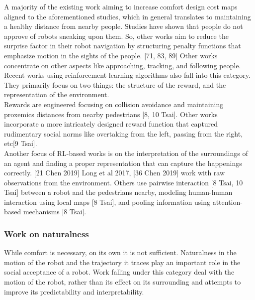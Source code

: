 A majority of the existing work aiming to increase comfort design cost maps aligned to the aforementioned studies, which in general translates to maintaining a healthy distance from nearby people. Studies have shown that people do not approve of robots sneaking upon them. So, other works aim to reduce the surprise factor in their robot navigation by structuring penalty functions that emphasize motion in the sights of the people. [71, 83, 89]
Other works concentrate on other aspects like approaching, tracking, and following people.\\

Recent works using reinforcement learning algorithms also fall into this category. They primarily focus on two things: the structure of the reward, and the representation of the environment. \\

Rewards are engineered focusing on collision avoidance and maintaining proxemics distances from nearby pedestrians [8, 10 Tsai]. Other works incorporate a more intricately designed reward function that captured rudimentary social norms like overtaking from the left, passing from the right, etc[9 Tsai]. \\

Another focus of RL-based works is on the interpretation of the surroundings of an agent and finding a proper representation that can capture the happenings correctly. [21 Chen 2019] Long et al 2017, [36 Chen 2019] work with raw observations from the environment. Others use pairwise interaction [8 Tsai, 10 Tsai] between a robot and the pedestrians nearby, modeling human-human interaction using local maps [8 Tsai], and pooling information using attention-based mechanisms [8 Tsai].

\subsubsection{Work on naturalness}
While comfort is necessary, on its own it is not sufficient. Naturalness in the motion of the robot and the trajectory it traces play an important role in the social acceptance of a robot. Work falling under this category deal with the motion of the robot, rather than its effect on its surrounding and attempts to improve its predictability and interpretability.\\ %

